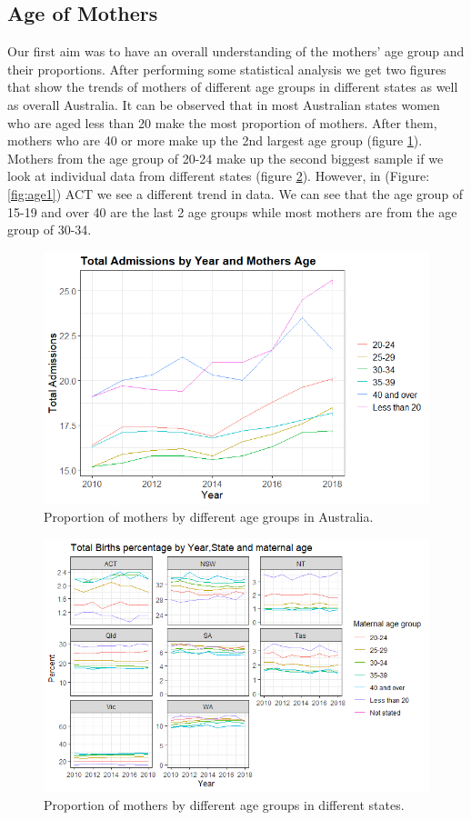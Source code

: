 \subsection{Age of Mothers}
Our first aim was to have an overall understanding of the mothers' age group and their proportions. After performing some statistical analysis we get two figures that show the trends of mothers of different age groups in different states as well as overall Australia. It can be observed that in most Australian states women who are aged less than 20 make the most proportion of mothers. After them, mothers who are 40 or more make up the 2nd largest age group (figure \ref{fig:age0.1}). Mothers from the age group of 20-24 make up the second biggest sample if we look at individual data from different states (figure \ref{fig:age0.2}). However, in (Figure: \ref{fig:age1}) ACT we see a different trend in data. We can see that the age group of 15-19 and over 40 are the last 2 age groups while most mothers are from the age group of 30-34. 

\begin{figure}
  \centering
  \includegraphics[width=1\textwidth]{subsections/age_mothers/mothers_age.png}
  \caption{Proportion of mothers by different age groups in Australia.}
  \label{fig:age0.1}
\end{figure}

\begin{figure}
  \centering
  \includegraphics[width=1\textwidth]{subsections/age_mothers/birth_age_state.png}
  \caption{Proportion of mothers by different age groups in different states.}
  \label{fig:age0.2}
\end{figure}

